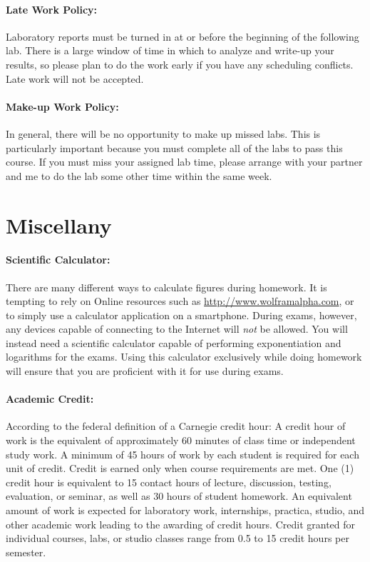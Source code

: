 \documentclass[12pt, letterpaper]{article}
\begin{document}
\paragraph{Late Work Policy:}
Laboratory reports must be turned in at or before the beginning of the following lab. There is a large window of time in which to analyze and write-up your results, so please plan to do the work early if you have any scheduling conflicts. Late work will not be accepted.

\paragraph{Make-up Work Policy:}
In general, there will be no opportunity to make up missed labs. This is particularly important because you must complete all of the labs to pass this course. If you must miss your assigned lab time, please arrange with your partner and me to do the lab some other time within the same week.


\section*{Miscellany}

\paragraph{Scientific Calculator:}
There are many different ways to calculate figures during homework. It is tempting to rely on Online resources such as \href{http://www.wolframalpha.com}{http://www.wolframalpha.com}, or to simply use a calculator application on a smartphone. During exams, however, any devices capable of connecting to the Internet will \emph{not} be allowed. You will instead need a scientific calculator capable of performing exponentiation and logarithms for the exams. Using this calculator exclusively while doing homework will ensure that you are proficient with it for use during exams.

\paragraph{Academic Credit:}
According to the federal definition of a Carnegie credit hour: A credit hour of work is the equivalent of approximately 60 minutes of class time or independent study work. A minimum of 45 hours of work by each student is required for each unit of credit. Credit is earned only when course requirements are met. One (1) credit hour is equivalent to 15 contact hours of lecture, discussion, testing, evaluation, or seminar, as well as 30 hours of student homework. An equivalent amount of work is expected for laboratory work, internships, practica, studio, and other academic work leading to the awarding of credit hours. Credit granted for individual courses, labs, or studio classes range from 0.5 to 15 credit hours per semester.
\end{document}
